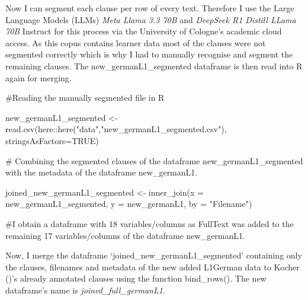 \documentclass[
  letterpaper,
  DIV=11,
  numbers=noendperiod]{scrartcl}
\newenvironment{Shaded}{\begin{snugshade}}{\end{snugshade}}
\newcommand{\AttributeTok}[1]{\textcolor[rgb]{0.40,0.45,0.13}{#1}}
\newcommand{\CommentTok}[1]{\textcolor[rgb]{0.37,0.37,0.37}{#1}}
\newcommand{\ConstantTok}[1]{\textcolor[rgb]{0.56,0.35,0.01}{#1}}
\newcommand{\FunctionTok}[1]{\textcolor[rgb]{0.28,0.35,0.67}{#1}}
\newcommand{\NormalTok}[1]{\textcolor[rgb]{0.00,0.23,0.31}{#1}}
\newcommand{\OtherTok}[1]{\textcolor[rgb]{0.00,0.23,0.31}{#1}}
\newcommand{\SpecialCharTok}[1]{\textcolor[rgb]{0.37,0.37,0.37}{#1}}
\newcommand{\StringTok}[1]{\textcolor[rgb]{0.13,0.47,0.30}{#1}}
\begin{document}
Now I can segment each clause per row of every text. Therefore I use the
Large Language Models (LLMs) \emph{Meta Llama 3.3 70B} and
\emph{DeepSeek R1 Distill LLama 70B} Instruct for this process via the
University of Cologne's academic cloud access. As this copus contains
learner data most of the clauses were not segmented correctly which is
why I had to manually recognise and segment the remaining clauses. The
new\_germanL1\_segmented dataframe is then read into R again for
merging.

\begin{Shaded}
\begin{Highlighting}[]
\CommentTok{\#Reading the manually segmented file in R}

\NormalTok{new\_germanL1\_segmented }\OtherTok{\textless{}{-}} \FunctionTok{read.csv}\NormalTok{(here}\SpecialCharTok{::}\FunctionTok{here}\NormalTok{(}\StringTok{"data"}\NormalTok{,}\StringTok{"new\_germanL1\_segmented.csv"}\NormalTok{), }\AttributeTok{stringsAsFactors=}\ConstantTok{TRUE}\NormalTok{)}

\CommentTok{\# Combining the segmented clauses of the dataframe \textquotesingle{}new\_germanL1\_segmented\textquotesingle{} with the metadata of the dataframe \textquotesingle{}new\_germanL1\textquotesingle{}.}

\NormalTok{joined\_new\_germanL1\_segmented }\OtherTok{\textless{}{-}} \FunctionTok{inner\_join}\NormalTok{(}\AttributeTok{x =}\NormalTok{ new\_germanL1\_segmented, }\AttributeTok{y =}\NormalTok{ new\_germanL1, }\AttributeTok{by =} \StringTok{"Filename"}\NormalTok{)}

\CommentTok{\#I obtain a dataframe with 18 variables/columns as \textquotesingle{}FullText\textquotesingle{} was added to the remaining 17 variables/columns of the dataframe \textquotesingle{}new\_germanL1\textquotesingle{}.}
\end{Highlighting}
\end{Shaded}

Now, I merge the dataframe `joined\_new\_germanL1\_segmented' containing
only the clauses, filenames and metadata of the new added L1German data
to Kocher ()'s already annotated clauses
using the function bind\_rows(). The new dataframe's name is
\emph{joined\_full\_germanL1}.
\end{document}
